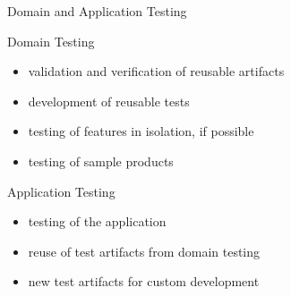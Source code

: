 \begin{frame}{Domain and Application Testing}
	\begin{mycolumns}[T,columns=3,widths={10}]
		\renewcommand{\projectcartoonwidth}{1}
	\mynextcolumn
		\begin{definition}{Domain Testing} %
			\begin{itemize}
				\item validation and verification of reusable artifacts
				\item development of reusable tests
				\item testing of features in isolation, if possible \lectureanalyses
				\item testing of sample products \lecturetesting
			\end{itemize}
		\end{definition}
	\mynextcolumn
		\begin{definition}{Application Testing}
			\begin{itemize}
				\item testing of the application
				\item reuse of test artifacts from domain testing
				\item new test artifacts for custom development
			\end{itemize}
		\end{definition}
	\end{mycolumns}
\end{frame}

